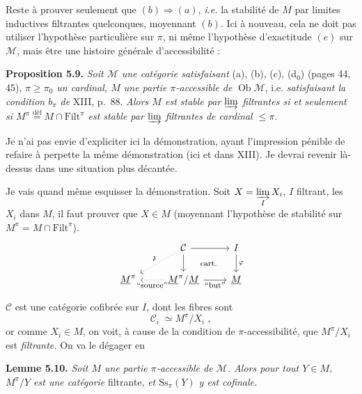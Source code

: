 \documentclass[11pt]{article}
\newcommand{\printedpage}[1]{\marginpar{\footnotesize p.~#1}}
\newcommand{\msp}[1]{\marginpar{\footnotesize [#1]}}
\newcommand{\M}{\mathcal{M}}
\newcommand{\Filt}{\mathrm{Filt}}
\newcommand{\Ob}{\operatorname{Ob}}
\newcommand{\Ss}{\mathrm{Ss}}
\newcommand{\Ci}{\mathcal{C}}
\begin{document}
Reste à prouver seulement que $(b) \Longrightarrow (a)$, \textit{i.e.} la stabilité de $M$ par limites inductives filtrantes quelconques, moyennant $(b)$. Ici à nouveau, cela ne doit pas utiliser l'hypothèse particulière sur $\pi$, ni même l'hypothèse d'exactitude $(e)$ sur $\M$, mais être une histoire générale d'accessibilité :

\textbf{Proposition 5.9.} \textit{Soit $\M$ une catégorie satisfaisant} (a), (b), (c), (d$_0$) (pages 44, 45), \textit{$\pi \geq \pi_0$ un cardinal, $M$ une partie $\pi$-accessible de} $\Ob\M$, i.e. \textit{satisfaisant la condition $b_\pi$ de} XIII, p.~88. \textit{Alors $M$ est stable par $\varinjlim$ filtrantes si et seulement si $M^\pi \overset{\text{déf}}{=} M \cap \Filt^\pi$ est stable par $\varinjlim$ filtrantes de cardinal $\leq \pi$.}

Je n'ai pas envie d'expliciter ici la démonstration, ayant l'impression pénible de refaire à perpette la même démonstration (ici et dans XIII). Je devrai revenir là-dessus dans une situation plus décantée.

\msp{page 62}

Je vais quand même esquisser la démonstration. Soit $X = \varinjlim\limits_{I} X_i$, $I$ filtrant, les $X_i$ dans $M$, il faut prouver que $X \in M$ (moyennant l'hypothèse de stabilité sur $M^\pi = M \cap \Filt^\pi$).
\printedpage{37}
\[
\begin{tikzcd}
& \Ci \arrow[r] \arrow[d] \arrow[dl, dotted, "\mathfrak{z}"'] \arrow[dr, phantom, "\text{\footnotesize cart.}"] & I \arrow[d, "\varphi"] \\
\underline{M}^\pi & \underline{M}^\pi/\underline{M} \arrow[l, dotted, "\text{\footnotesize “source”}"] \arrow[r, "\text{\footnotesize “but”}"'] & \underline{M}
\end{tikzcd}
\] %

$\Ci$ est une catégorie cofibrée sur $I$, dont les fibres sont
\[
\Ci_i \;\simeq M^\pi/X_i \;,
\]
or comme $X_i \in M$, on voit, à cause de la condition de $\pi$-accessibilité, que $M^\pi/X_i$ est \textit{filtrante.} On va le dégager en

\textbf{Lemme 5.10.} \textit{Soit $M$ une partie $\pi$-accessible de $\M$. Alors pour tout $Y \in M$, $M^\pi/Y$ est une catégorie} filtrante, \textit{et $\Ss_\pi(Y)$ y est cofinale.}

\msp{page 63}
\end{document}
